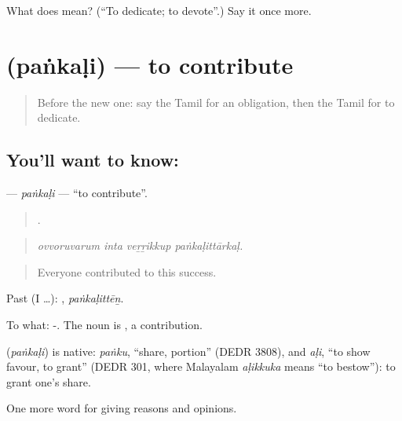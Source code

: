 \begin{tcolorbox}[breakable,colback=teal!4,colframe=teal!35!black,title={Before you move on}]
What does  mean? (\textquotedblleft{}To dedicate; to devote\textquotedblright{}.) Say it once more.
\end{tcolorbox}
\section[\texorpdfstring{\ta{பங்களி} (paṅkaḷi)}{பங்களி (paṅkaḷi)}]{ (paṅkaḷi) — to contribute}

\label{lesson:TA-C380-pankali}



\begin{quote}
Before the new one: say the Tamil for an obligation, then the Tamil for to dedicate.
\end{quote}

\subsection*{You'll want to know: }
\textbf{} — \emph{paṅkaḷi} — \textquotedblleft{}to contribute\textquotedblright{}.

\begin{quote}
   .
\end{quote}

\begin{quote}
\emph{ovvoruvarum inta veṟṟikkup paṅkaḷittārkaḷ.}
\end{quote}

\begin{quote}
Everyone contributed to this success.
\end{quote}

Past (I …): , \emph{paṅkaḷittēṉ}.

To what: -. The noun is , a contribution.

\begin{cousinweb}
\textbf{} (\emph{paṅkaḷi}) is native: \emph{paṅku}, \textquotedblleft{}share, portion\textquotedblright{} (DEDR 3808), and \emph{aḷi}, \textquotedblleft{}to show favour, to grant\textquotedblright{} (DEDR 301, where Malayalam \emph{aḷikkuka} means \textquotedblleft{}to bestow\textquotedblright{}): to grant one's share.
\end{cousinweb}

\begin{grammarlens}[title={What you've built}]
One more word for giving reasons and opinions.
\end{grammarlens}

